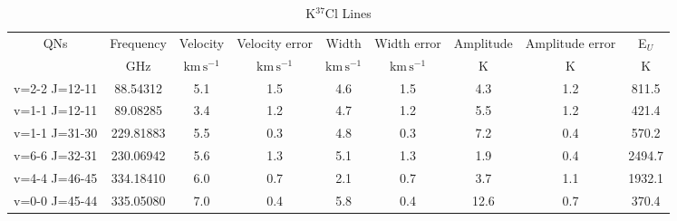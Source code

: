 \begin{table*}[htp]
\centering
\caption{K$^{37}$Cl Lines}
\begin{tabular}{ccccccccc}
\label{tab:K37Cl_salt_lines}
QNs & Frequency & Velocity & Velocity error & Width & Width error & Amplitude & Amplitude error & E$_U$ \\
 & $\mathrm{GHz}$ & $\mathrm{km\,s^{-1}}$ & $\mathrm{km\,s^{-1}}$ & $\mathrm{km\,s^{-1}}$ & $\mathrm{km\,s^{-1}}$ & $\mathrm{K}$ & $\mathrm{K}$ & $\mathrm{K}$ \\
\hline
v=2-2 J=12-11 & 88.54312 & 5.1 & 1.5 & 4.6 & 1.5 & 4.3 & 1.2 & 811.5 \\
v=1-1 J=12-11 & 89.08285 & 3.4 & 1.2 & 4.7 & 1.2 & 5.5 & 1.2 & 421.4 \\
v=1-1 J=31-30 & 229.81883 & 5.5 & 0.3 & 4.8 & 0.3 & 7.2 & 0.4 & 570.2 \\
v=6-6 J=32-31 & 230.06942 & 5.6 & 1.3 & 5.1 & 1.3 & 1.9 & 0.4 & 2494.7 \\
v=4-4 J=46-45 & 334.18410 & 6.0 & 0.7 & 2.1 & 0.7 & 3.7 & 1.1 & 1932.1 \\
v=0-0 J=45-44 & 335.05080 & 7.0 & 0.4 & 5.8 & 0.4 & 12.6 & 0.7 & 370.4 \\
\hline
\end{tabular}

\par 
\end{table*}

